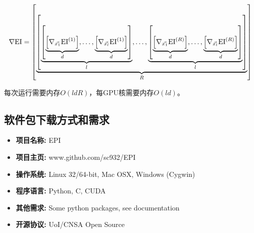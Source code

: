 \documentclass[index]{subfiles}
\begin{document}
\begin{equation}
    \nabla {\rm EI} = \left[ \underbrace{ \left[ \underbrace{ \left[ \underbrace{ \left[ \nabla_{\vec{x_{1}}} {\rm EI}^{(1)} \right]}_{d} , \ldots, \underbrace{ \left[ \nabla_{\vec{x_{l}}} {\rm EI}^{(1)} \right]}_{d}\right]}_{l}, \ldots, \underbrace{ \left[ \underbrace{ \left[ \nabla_{\vec{x_{1}}} {\rm EI}^{(R)} \right]}_{d} , \ldots, \underbrace{ \left[ \nabla_{\vec{x_{l}}} {\rm EI}^{(R)} \right]}_{d}\right]}_{l} \right]}_{R} \right]\end{equation}

每次运行需要内存$O(ldR)$，每GPU核需要内存$O(ld)$。




\subsection{软件包下载方式和需求}
 \begin{itemize}
  \item \textbf{项目名称:} EPI
  \item \textbf{项目主页:} www.github.com/sc932/EPI
  \item \textbf{操作系统:} Linux 32/64-bit, Mac OSX, Windows (Cygwin)
  \item \textbf{程序语言:} Python, C, CUDA
  \item \textbf{其他需求:} Some python packages, see documentation
  \item \textbf{开源协议:} UoI/CNSA Open Source
 \end{itemize}



\end{document}
